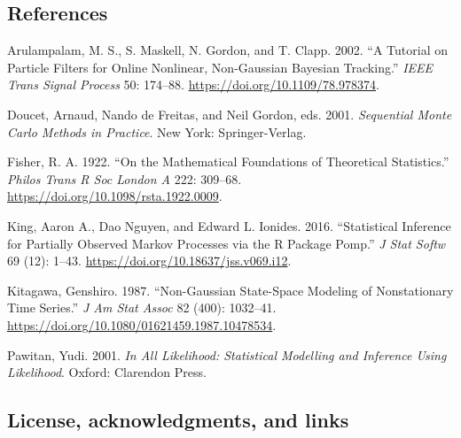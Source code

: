 \documentclass[
  letterpaper,
  DIV=11,
  numbers=noendperiod]{scrartcl}
\newlength{\cslhangindent}
\newlength{\cslentryspacingunit} %
\newenvironment{CSLReferences}[2] %
 {%
  \setlength{\parindent}{0pt}
  \ifodd #1
  \let\oldpar\par
  \def\par{\hangindent=\cslhangindent\oldpar}
  \fi
  \setlength{\parskip}{#2\cslentryspacingunit}
 }%
 {}
\begin{document}
\hypertarget{references-1}{%
\subsection{References}\label{references-1}}

\small

\hypertarget{refs}{}
\begin{CSLReferences}{1}{0}
\leavevmode{}%
Arulampalam, M. S., S. Maskell, N. Gordon, and T. Clapp. 2002. {``A
Tutorial on Particle Filters for Online Nonlinear, Non-{Gaussian}
{Bayesian} Tracking.''} \emph{IEEE Trans Signal Process} 50: 174--88.
\url{https://doi.org/10.1109/78.978374}.

\leavevmode{}%
Doucet, Arnaud, Nando de Freitas, and Neil Gordon, eds. 2001.
\emph{Sequential {Monte} {Carlo} Methods in Practice}. New York:
Springer-Verlag.

\leavevmode{}%
Fisher, R. A. 1922. {``On the Mathematical Foundations of Theoretical
Statistics.''} \emph{Philos Trans R Soc London A} 222: 309--68.
\url{https://doi.org/10.1098/rsta.1922.0009}.

\leavevmode{}%
King, Aaron A., Dao Nguyen, and Edward L. Ionides. 2016. {``Statistical
Inference for Partially Observed {Markov} Processes via the {R} Package
Pomp.''} \emph{J Stat Softw} 69 (12): 1--43.
\url{https://doi.org/10.18637/jss.v069.i12}.

\leavevmode{}%
Kitagawa, Genshiro. 1987. {``Non-{Gauss}ian State-Space Modeling of
Nonstationary Time Series.''} \emph{J Am Stat Assoc} 82 (400): 1032--41.
\url{https://doi.org/10.1080/01621459.1987.10478534}.

\leavevmode{}%
Pawitan, Yudi. 2001. \emph{{I}n {A}ll {L}ikelihood: {S}tatistical
{M}odelling and {I}nference {U}sing {L}ikelihood}. Oxford: Clarendon
Press.

\end{CSLReferences}

\hypertarget{license-acknowledgments-and-links}{%
\subsection{License, acknowledgments, and
links}\label{license-acknowledgments-and-links}}
\end{document}
